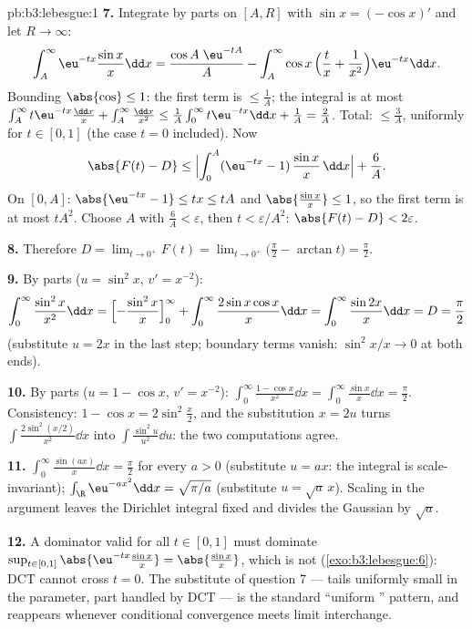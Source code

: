 \begin{solution}{pb:b3:lebesgue:1}
\textbf{7.} Integrate by parts on $[A, R]$ with $\sin x =
(-\cos x)'$ and let $R \to \infty$:
\[
\int_A^{\infty}\eu^{-tx}\frac{\sin x}x\dd x
= \frac{\cos A\;\eu^{-tA}}{A}
- \int_A^\infty \cos x\,\Bigl(\frac tx +
\frac1{x^2}\Bigr)\eu^{-tx}\dd x .
\]
Bounding $\abs{\cos} \leq 1$: the first term is $\leq \frac1A$;
the integral is at most $\int_A^\infty t\eu^{-tx}\frac{\dd x}x
+ \int_A^\infty\frac{\dd x}{x^2} \leq \frac1A\int_0^\infty
t\eu^{-tx}\dd x + \frac1A = \frac2A$. Total: $\leq \frac 3A$,
uniformly for $t \in [0, 1]$ (the case $t = 0$ included). Now
\[
\abs{F(t) - D} \leq
\Bigl|\int_0^A(\eu^{-tx} - 1)\,\frac{\sin x}x\,\dd x\Bigr| +
\frac6A .
\]
On $[0, A]$: $\abs{\eu^{-tx} - 1} \leq tx \leq tA$ and
$\abs{\frac{\sin x}x} \leq 1$, so the first term is at most
$tA^2$. Choose $A$ with $\frac6A < \varepsilon$, then $t <
\varepsilon/A^2$: $\abs{F(t) - D} < 2\varepsilon$.

\textbf{8.} Therefore $D = \lim_{t\to0^+}F(t) =
\lim_{t\to0^+}\bigl(\frac\pi2 - \arctan t\bigr) =
\frac\pi2$.

\textbf{9.} By parts ($u = \sin^2x$, $v' = x^{-2}$):
\[
\int_0^\infty\frac{\sin^2x}{x^2}\dd x
= \Bigl[-\frac{\sin^2x}{x}\Bigr]_0^\infty +
\int_0^\infty\frac{2\sin x\cos x}{x}\dd x
= \int_0^\infty\frac{\sin 2x}{x}\dd x = D = \frac\pi2
\]
(substitute $u = 2x$ in the last step; boundary terms vanish:
$\sin^2 x/x \to 0$ at both ends).

\textbf{10.} By parts ($u = 1 - \cos x$, $v' = x^{-2}$):
$\int_0^\infty\frac{1 - \cos x}{x^2}\dd x =
\int_0^\infty\frac{\sin x}x\dd x = \frac\pi2$. Consistency:
$1 - \cos x = 2\sin^2\frac x2$, and the substitution $x = 2u$
turns $\int\frac{2\sin^2(x/2)}{x^2}\dd x$ into
$\int\frac{\sin^2u}{u^2}\dd u$: the two computations agree.

\textbf{11.} $\int_0^\infty\frac{\sin(ax)}x\dd x = \frac\pi2$
for every $a > 0$ (substitute $u = ax$: the integral is
scale-invariant); $\int_\R\eu^{-ax^2}\dd x = \sqrt{\pi/a}$
(substitute $u = \sqrt a\,x$). Scaling in the argument leaves
the Dirichlet integral fixed and divides the Gaussian by
$\sqrt a$.

\textbf{12.} A dominator valid for all $t \in [0,1]$ must
dominate $\sup_{t\in[0,1]}\abs{\eu^{-tx}\frac{\sin
x}x} = \abs{\frac{\sin x}x}$, which is not 
(\cref{exo:b3:lebesgue:6}): DCT cannot cross $t = 0$. The
substitute of question 7 --- tails uniformly small in the
parameter,  part handled by DCT --- is the standard
``uniform '' pattern, and reappears whenever
conditional convergence meets limit interchange.


\end{solution}
